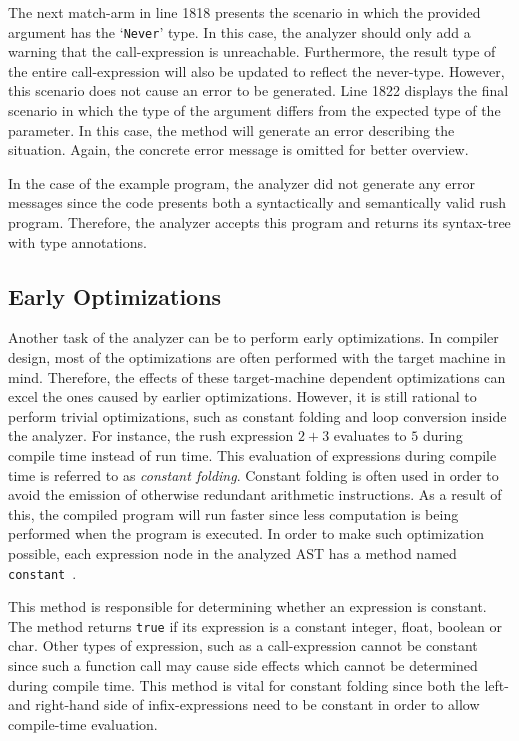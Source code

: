 The next match-arm in line 1818 presents the scenario in which the provided argument has the `\texttt{Never}' type.
In this case, the analyzer should only add a warning that the call-expression is unreachable.
Furthermore, the result type of the entire call-expression will also be updated to reflect the never-type.
However, this scenario does not cause an error to be generated.
Line 1822 displays the final scenario in which the type of the argument differs from the expected type of the parameter.
In this case, the method will generate an error describing the situation.
Again, the concrete error message is omitted for better overview.

In the case of the example program, the analyzer did not generate any error messages since the code presents both a syntactically and semantically valid rush program.
Therefore, the analyzer accepts this program and returns its syntax-tree with type annotations.

\subsection{Early Optimizations}

Another task of the analyzer can be to perform early optimizations.
In compiler design, most of the optimizations are often performed with the target machine in mind.
Therefore, the effects of these target-machine dependent optimizations can excel the ones caused by earlier optimizations.
However, it is still rational to perform trivial optimizations, such as constant folding and loop conversion inside the analyzer.
For instance, the rush expression $2 + 3$ evaluates to $5$ during compile time instead of run time.
This evaluation of expressions during compile time is referred to as \emph{constant folding}.
Constant folding is often used in order to avoid the emission of otherwise redundant arithmetic instructions.
As a result of this, the compiled program will run faster since less computation is being performed when the program is executed.
In order to make such optimization possible, each expression node in the analyzed AST has a method named \texttt{constant}~\cite[p.~54]{wirth_compiler_construction_2005}.


This method is responsible for determining whether an expression is constant.
The method returns \texttt{true} if its expression is a constant integer, float, boolean or char.
Other types of expression, such as a call-expression cannot be constant since such a function call may cause side effects which cannot be determined during compile time.
This method is vital for constant folding since both the left- and right-hand side of infix-expressions need to be constant in order to allow compile-time evaluation.

